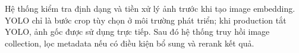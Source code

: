 Hệ thống kiểm tra định dạng và tiền xử lý ảnh trước khi tạo image embedding. YOLO chỉ là bước crop tùy chọn ở môi trường phát triển; khi production tắt YOLO, ảnh gốc được sử dụng trực tiếp. Sau đó hệ thống truy hồi image collection, lọc metadata nếu có điều kiện bổ sung và rerank kết quả.





